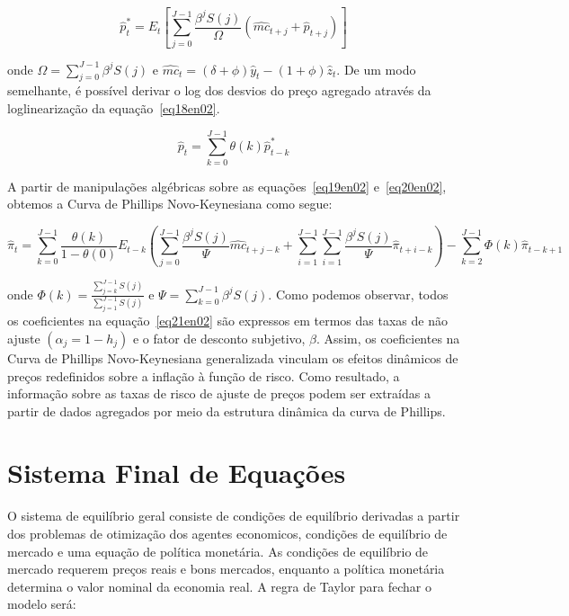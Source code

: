 \documentclass[twoside,a4paper,11pt]{report}
\begin{document}
{{\begin{equation}\label{eq19en02}
{\hat{p}}_{t}^{*}={E}_{t}[\sum_{j=0}^{J-1}{\frac{{\beta}^{j}S(j)}{\Omega}}({\hat{mc}}_{t+j}+{\hat{p}}_{t+j})] 
\end{equation}

\noindent onde $\Omega=\sum_{j=0}^{J-1}{{\beta}^{j}S(j)}$ e ${\hat{mc}}_{t}=(\delta +\phi){\hat{y}}_{t}-(1+\phi){\hat{z}}_{t}$. De um modo semelhante, é possível derivar o log dos desvios do preço agregado através da loglinearização da equação~\ref{eq18en02}.

\begin{equation}\label{eq20en02}
{\hat{p}}_{t}=\sum_{k=0}^{J-1}{\theta(k){\hat{p}}_{t-k}^{*}} 
\end{equation}

A partir de manipulações algébricas sobre as equações~\ref{eq19en02} e~\ref{eq20en02}, obtemos a Curva de Phillips Novo-Keynesiana como segue:

\begin{equation}\label{eq21en02}
{\hat{\pi}}_{t}=\sum_{k=0}^{J-1}{\frac{\theta(k)}{1-\theta(0)}{E}_{t-k}(\sum_{j=0}^{J-1}{\frac{{\beta}^{j}S(j)}{\Psi}{\hat{mc}}_{t+j-k}+\sum_{i=1}^{J-1}{\sum_{i=1}^{J-1}{\frac{{\beta}^{j}S(j)}{\Psi}}}{\hat{\pi}}_{t+i-k}})-\sum_{k=2}^{J-1}{\Phi(k){\hat{\pi}}_{t-k+1}}} 
\end{equation}

\noindent onde $\Phi(k)=\frac{\sum _{j=k}^{J-1}{S(j)}}{\sum _{j=1}^{J-1}{S(j)}}$ e $\Psi =\sum _{k=0}^{J-1}{{\beta}^{j}S(j)}$. Como podemos observar, todos os coeficientes na equação~\ref{eq21en02} são expressos em termos das taxas de não ajuste $({\alpha}_{j}=1-{h}_{j})$ e o fator de desconto subjetivo, $\beta$. Assim, os coeficientes na Curva de Phillips Novo-Keynesiana generalizada vinculam os efeitos dinâmicos de preços redefinidos sobre a inflação à função de risco. Como resultado, a informação sobre as taxas de risco de ajuste de preços podem ser extraídas a partir de dados agregados por meio da estrutura dinâmica da curva de Phillips.


\section*{Sistema Final de Equações}

O sistema de equilíbrio geral consiste de condições de equilíbrio derivadas a partir dos problemas de otimização dos agentes economicos, condições de equilíbrio de mercado e uma equação de política monetária. As condições de equilíbrio de mercado requerem preços reais e bons mercados, enquanto a política monetária determina o valor nominal da economia real. A regra de Taylor para fechar o modelo será:

}}
\end{document}
